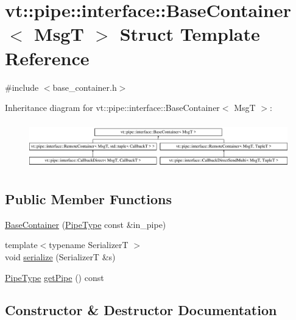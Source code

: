 \hypertarget{structvt_1_1pipe_1_1interface_1_1_base_container}{}\section{vt\+:\+:pipe\+:\+:interface\+:\+:Base\+Container$<$ MsgT $>$ Struct Template Reference}
\label{structvt_1_1pipe_1_1interface_1_1_base_container}


{\ttfamily \#include $<$base\+\_\+container.\+h$>$}

Inheritance diagram for vt\+:\+:pipe\+:\+:interface\+:\+:Base\+Container$<$ MsgT $>$\+:\begin{figure}[H]
\begin{center}
\leavevmode
\includegraphics[height=2.043796cm]{structvt_1_1pipe_1_1interface_1_1_base_container}
\end{center}
\end{figure}
\subsection*{Public Member Functions}
\begin{DoxyCompactItemize}
\item 
\hyperlink{structvt_1_1pipe_1_1interface_1_1_base_container_a096a87229f8c5b3b3bd0cca47cc7f45a}{Base\+Container} (\hyperlink{namespacevt_ac9852acda74d1896f48f406cd72c7bd3}{Pipe\+Type} const \&in\+\_\+pipe)
\item 
{\footnotesize template$<$typename SerializerT $>$ }\\void \hyperlink{structvt_1_1pipe_1_1interface_1_1_base_container_af042ddd27d8c1d683af861e2d12e0940}{serialize} (SerializerT \&s)
\item 
\hyperlink{namespacevt_ac9852acda74d1896f48f406cd72c7bd3}{Pipe\+Type} \hyperlink{structvt_1_1pipe_1_1interface_1_1_base_container_a5301aebfd709a96a3de5e03218c9300f}{get\+Pipe} () const
\end{DoxyCompactItemize}


\subsection{Constructor \& Destructor Documentation}
\mbox{\label{structvt_1_1pipe_1_1interface_1_1_base_container_a096a87229f8c5b3b3bd0cca47cc7f45a}} 
